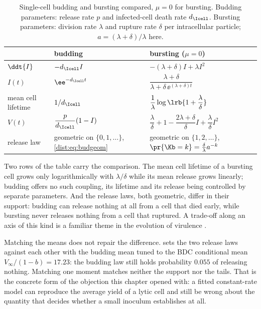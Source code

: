 \begin{table}[tbp]
\centering
\renewcommand{\arraystretch}{1.35}
\small
\begin{tabular}{@{}lll@{}}
\toprule
 & budding & bursting ($\mu=0$) \\
\midrule
$\ddt{I}$ & $-d_{\Icell} I$ & $-(\lambda+\delta)I+\lambda I^2$ \\
$I(t)$ & $\ee^{-d_{\Icell}t}$ & $\dfrac{\lambda+\delta}{\lambda+\delta\,\ee^{(\lambda+\delta)t}}$ \\
mean cell lifetime & $1/d_{\Icell}$ & $\dfrac{1}{\lambda}\log\lrb{1+\dfrac{\lambda}{\delta}}$ \\
$V(t)$ & $\dfrac{p}{d_{\Icell}}(1-I)$ & $\dfrac{\lambda}{\delta}+1-\dfrac{2\lambda+\delta}{\delta}I+\dfrac{\lambda}{\delta}I^2$ \\
release law & geometric on $\{0,1,\ldots\}$, \cref{dist:eq:budgeom} & geometric on $\{1,2,\ldots\}$, $\pr{\Kb=k}=\frac{\delta}{\lambda}a^{-k}$ \\
\bottomrule
\end{tabular}
\caption{Single-cell budding and bursting compared, $\mu=0$ for bursting.
Budding parameters: release rate $p$ and infected-cell death rate
$d_{\Icell}$. Bursting parameters: division rate $\lambda$ and rupture rate
$\delta$ per intracellular particle; $a=(\lambda+\delta)/\lambda$ here.}
\label{dist:tab:budburst}
\end{table}

Two rows of the table carry the comparison. The mean cell lifetime of a
bursting cell grows only logarithmically with $\lambda/\delta$ while its mean
release grows linearly; budding offers no such coupling, its lifetime and its
release being controlled by separate parameters. And the release laws, both
geometric, differ in their support: budding can release nothing at all from a
cell that died early, while bursting never releases nothing from a cell that
ruptured. A trade-off along an axis of this kind is a familiar theme in the
evolution of virulence \cite{gilchrist2006evolution}.

Matching the means does not repair the difference. 
sets the two release laws against each other with the budding mean tuned to
the BDC conditional mean $V_\infty/(1-b)=17.23$: the budding law still holds
probability $0.055$ of releasing nothing. Matching one moment matches neither
the support nor the tails. That is the concrete form of the objection this
chapter opened with: a fitted constant-rate model can reproduce the average
yield of a lytic cell and still be wrong about the quantity that decides
whether a small inoculum establishes at all.

